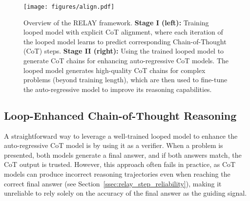\begin{figure*}[t]
    \centering
    \texttt{[image: figures/align.pdf]}
    \caption{Overview of the RELAY framework. \textbf{Stage I (left):} Training looped model with explicit CoT alignment, where each iteration of the looped model learns to predict corresponding Chain-of-Thought (CoT) steps. \textbf{Stage II (right):} Using the trained looped model to generate CoT chains for enhancing auto-regressive CoT models. The looped model generates high-quality CoT chains for complex problems (beyond training length), which are then used to fine-tune the auto-regressive model to improve its reasoning capabilities.}
    \label{fig:loop_align_cot}
\end{figure*}

\subsection{Loop-Enhanced Chain-of-Thought Reasoning}

A straightforward way to leverage a well-trained looped model to enhance the auto-regressive CoT model is by using it as a verifier. When a problem is presented, both models generate a final answer, and if both answers match, the CoT output is trusted. However, this approach often fails in practice, as CoT models can produce incorrect reasoning trajectories even when reaching the correct final answer (see Section~\ref{ssec:relay_step_reliability}), making it unreliable to rely solely on the accuracy of the final answer as the guiding signal.



